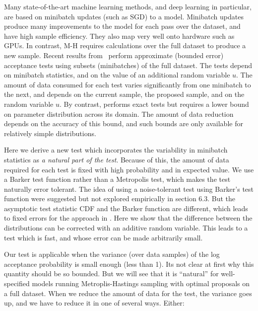 \documentclass{article}
\begin{document}
Many state-of-the-art machine learning methods, and deep learning in
particular, are based on minibatch updates (such as SGD) to a model.
Minibatch updates produce many improvements to the model for each pass
over the dataset, and have high sample efficiency. They also
map very well onto hardware such as GPUs. In contrast, M-H requires
calculations over the full dataset to produce a new sample.  Recent
results from~\cite{cutting_mh_2014,icml2014c1_bardenet14} perform
approximate (bounded error) acceptance tests using subsets
(minibatches) of the full dataset. The tests depend on minibatch
statistics, and on the value of an additional random variable $u$. The
amount of data consumed for each test varies significantly from one
minibatch to the next, and depends on the current sample, the proposed
sample, and on the random variable $u$. By contrast,
\cite{conf/uai/MaclaurinA14} performs exact tests but requires a lower
bound on parameter distribution across its domain. The amount of data
reduction depends on the accuracy of this bound, and such bounds are
only available for relatively simple distributions.

Here we derive a new test which incorporates the variability in
minibatch statistics as {\em a natural part of the test}. Because of
this, the amount of data required for each test is fixed with high
probability and in expected value. We use a Barker test function
\cite{Barker65} rather than a Metropolis test, which makes the test
naturally error tolerant. The idea of using a noise-tolerant test
using Barker's test function were suggested but not explored
empirically in \cite{Bardenet15} section 6.3. But the asymptotic test
statistic CDF and the Barker function are different, which leads to
fixed errors for the approach in \cite{Bardenet15}. Here we show that
the difference between the distributions can be corrected with an
additive random variable. This leads to a test which is fast, and
whose error can be made arbitrarily small.

Our test is applicable when the variance (over data samples) of the
log acceptance probability is small enough (less than 1). Its not
clear at first why this quantity should be so bounded. But we will see
that it is ``natural'' for well-specified models running
Metroplis-Hastings sampling with optimal proposals
\cite{OptimalScaling01} on a full dataset. When we reduce the amount
of data for the test, the variance goes up, and we have to reduce
it in one of several ways. Either:
\end{document}
